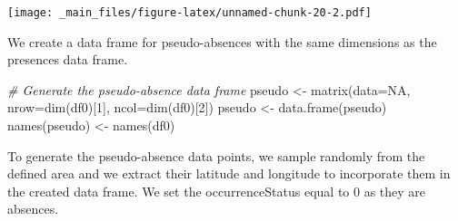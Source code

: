 \documentclass[
]{book}
\newenvironment{Shaded}{\begin{snugshade}}{\end{snugshade}}
\newcommand{\AttributeTok}[1]{\textcolor[rgb]{0.77,0.63,0.00}{#1}}
\newcommand{\CommentTok}[1]{\textcolor[rgb]{0.56,0.35,0.01}{\textit{#1}}}
\newcommand{\ConstantTok}[1]{\textcolor[rgb]{0.00,0.00,0.00}{#1}}
\newcommand{\DecValTok}[1]{\textcolor[rgb]{0.00,0.00,0.81}{#1}}
\newcommand{\FunctionTok}[1]{\textcolor[rgb]{0.00,0.00,0.00}{#1}}
\newcommand{\NormalTok}[1]{#1}
\newcommand{\OtherTok}[1]{\textcolor[rgb]{0.56,0.35,0.01}{#1}}
\newcommand{\SpecialCharTok}[1]{\textcolor[rgb]{0.00,0.00,0.00}{#1}}
\newcommand{\StringTok}[1]{\textcolor[rgb]{0.31,0.60,0.02}{#1}}
\begin{document}
\texttt{[image: \_main\_files/figure-latex/unnamed-chunk-20-2.pdf]}

We create a data frame for pseudo-absences with the same dimensions as the presences data frame.

\begin{Shaded}
\begin{Highlighting}[]
\CommentTok{\# Generate the pseudo{-}absence data frame}
\NormalTok{pseudo }\OtherTok{\textless{}{-}} \FunctionTok{matrix}\NormalTok{(}\AttributeTok{data=}\ConstantTok{NA}\NormalTok{, }\AttributeTok{nrow=}\FunctionTok{dim}\NormalTok{(df0)[}\DecValTok{1}\NormalTok{], }\AttributeTok{ncol=}\FunctionTok{dim}\NormalTok{(df0)[}\DecValTok{2}\NormalTok{])}
\NormalTok{pseudo }\OtherTok{\textless{}{-}} \FunctionTok{data.frame}\NormalTok{(pseudo)}
\FunctionTok{names}\NormalTok{(pseudo) }\OtherTok{\textless{}{-}} \FunctionTok{names}\NormalTok{(df0)}
\end{Highlighting}
\end{Shaded}

To generate the pseudo-absence data points, we sample randomly from the defined area and we extract their latitude and longitude to incorporate them in the created data frame. We set the occurrenceStatus equal to 0 as they are absences.

\begin{Shaded}
\end{Shaded}
\end{document}
